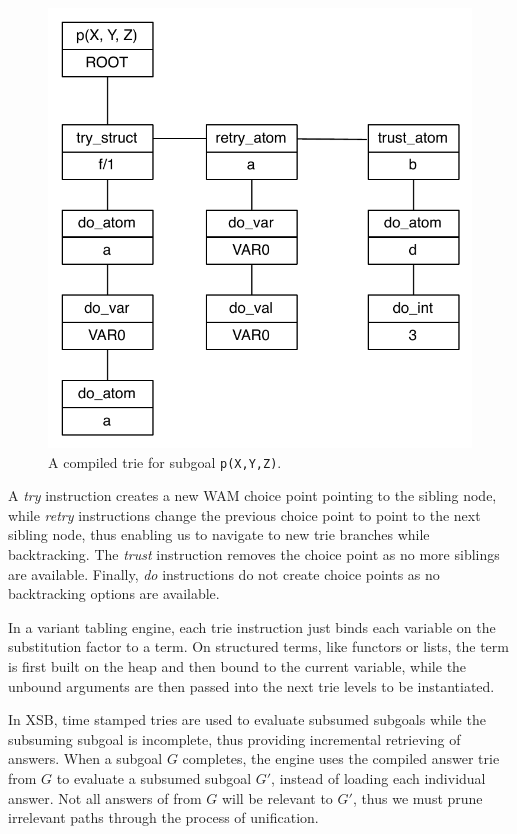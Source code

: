 \begin{figure}[H]
  \centering
    \includegraphics[scale=0.6]{compiled_trie.pdf}
  \caption{A compiled trie for subgoal \texttt{p(X,Y,Z)}.}
  \label{fig:compiled_trie}
\end{figure}

A \textit{try} instruction creates a new WAM choice point pointing to the sibling node,
while \textit{retry} instructions change the previous choice point to point to the next sibling node,
thus enabling us to navigate to new trie branches while backtracking. The \textit{trust}
instruction removes the choice point as no more siblings are available. Finally, \textit{do}
instructions do not create choice points as no backtracking options are available.

In a variant tabling engine, each trie instruction just binds each variable on the substitution factor to a term.
On structured terms, like functors or lists, the term is first built on the heap and then
bound to the current variable, while the unbound arguments are then passed into the next trie levels
to be instantiated.

In XSB, time stamped tries are used to evaluate subsumed subgoals while the subsuming subgoal
is incomplete, thus providing incremental retrieving of answers.
When a subgoal $G$ completes, the engine uses the compiled answer trie from $G$
to evaluate a subsumed subgoal $G'$, instead of loading each individual answer.
Not all answers of from $G$ will be relevant to $G'$, thus we must prune irrelevant paths
through the process of unification. 


